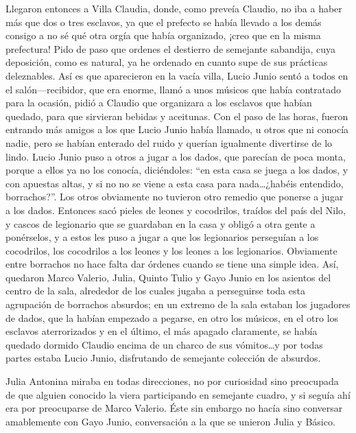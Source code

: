 \documentclass[11pt,openany]{book}
\begin{document}
Llegaron entonces a Villa Claudia, donde, como preveía Claudio, no iba a haber más que dos o tres esclavos, ya que el prefecto se había llevado a los demás consigo a no sé qué otra orgía que había organizado, ¡creo que en la misma prefectura! Pido de paso que ordenes el destierro de semejante sabandija, cuya deposición, como es natural, ya he ordenado en cuanto supe de sus prácticas deleznables. Así es que aparecieron en la vacía villa, Lucio Junio sentó a todos en el salón—recibidor, que era enorme, llamó a unos músicos que había contratado para la ocasión, pidió a Claudio que organizara a los esclavos que habían quedado, para que sirvieran bebidas y aceitunas. Con el paso de las horas, fueron entrando más amigos a los que Lucio Junio había llamado, u otros que ni conocía nadie, pero se habían enterado del ruido y querían igualmente divertirse de lo lindo. Lucio Junio puso a otros a jugar a los dados, que parecían de poca monta, porque a ellos ya no los conocía, diciéndoles: “en esta casa se juega a los dados, y con apuestas altas, y si no no se viene a esta casa para nada\dots ¿habéis entendido, borrachos?”. Los otros obviamente no tuvieron otro remedio que ponerse a jugar a los dados. Entonces sacó pieles de leones y cocodrilos, traídos del país del Nilo, y cascos de legionario que se guardaban en la casa y obligó a otra gente a ponérselos, y a estos les puso a jugar a que los legionarios perseguían a los cocodrilos, los cocodrilos a los leones y los leones a los legionarios. Obviamente entre borrachos no hace falta dar órdenes cuando se tiene una simple idea. Así, quedaron Marco Valerio, Julia, Quinto Tulio y Gayo Junio en los asientos del centro de la sala, alrededor de los cuales jugaba a perseguirse toda esta agrupación de borrachos absurdos; en un extremo de la sala estaban los jugadores de dados, que la habían empezado a pegarse, en otro los músicos, en el otro los esclavos aterrorizados y en el último, el más apagado claramente, se había quedado dormido Claudio encima de un charco de sus vómitos\dots y por todas partes estaba Lucio Junio, disfrutando de semejante colección de absurdos. 

Julia Antonina miraba en todas direcciones, no por curiosidad sino preocupada de que alguien conocido la viera participando en semejante cuadro, y si seguía ahí era por preocuparse de Marco Valerio. Éste sin embargo no hacía sino conversar amablemente con Gayo Junio, conversación a la que se unieron Julia y Básico. 
\end{document}
